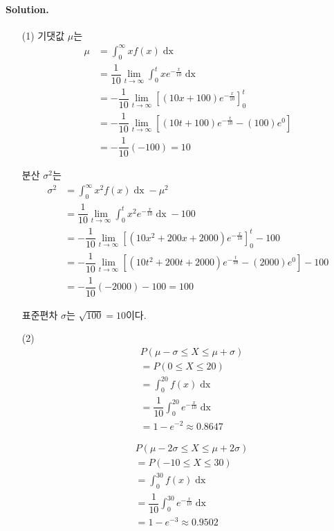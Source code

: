 \paragraph{Solution.}
\begin{itemize}
  \item [(1)] 기댓값 $\mu$는
\begin{align*}
  	\mu &= \int_0^\infty xf\left(x\right) \mathop{dx}\\
  	&= \dfrac{1}{10} \lim_{t \rightarrow \infty} \int_0^t xe^{-\frac{x}{10}} \mathop{dx}\\
  	&= -\dfrac{1}{10} \lim_{t \rightarrow \infty} \left[\left(10x + 100\right)e^{-\frac{x}{10}}\right]_0^t\\
  	&= -\dfrac{1}{10} \lim_{t \rightarrow \infty} \left[\left(10t + 100\right)e^{-\frac{t}{10}} - \left(100\right)e^0\right]\\
  	&= -\dfrac{1}{10}\left(-100\right) = 10
 \end{align*}
 
분산 $\sigma^2$는
\begin{align*}
  	\sigma^2 &= \int_0^\infty x^2f\left(x\right) \mathop{dx} - \mu^2\\
  	&= \dfrac{1}{10} \lim_{t \rightarrow \infty} \int_0^t x^2 e^{-\frac{x}{10}} \mathop{dx} - 100\\
  	&= -\dfrac{1}{10} \lim_{t \rightarrow \infty} \left[\left(10x^2 + 200x + 2000\right)e^{-\frac{x}{10}}\right]_0^t - 100\\
  	&= -\dfrac{1}{10} \lim_{t \rightarrow \infty} \left[\left(10t^2 + 200t + 2000\right)e^{-\frac{t}{10}} - \left(2000\right)e^0\right] - 100\\
  	&= -\dfrac{1}{10}\left(-2000\right) - 100 = 100
\end{align*}
 
표준편차 $\sigma$는 $\sqrt{100} = 10$이다.\\

  \item [(2)]
\begin{align*}
  	& P\left(\mu-\sigma\leq X\leq \mu+\sigma\right)\\
  	&= P\left(0 \leq X \leq 20\right)\\
  	&= \int_0^{20} f\left(x\right) \mathop{dx}\\
  	&= \dfrac{1}{10} \int_0^{20} e^{-\frac{x}{10}} \mathop{dx}\\
  	&= 1-e^{-2} \approx 0.8647
\end{align*}

\begin{align*}
  	& P\left(\mu-2\sigma\leq X\leq \mu+2\sigma\right)\\
  	&= P\left(-10 \leq X \leq 30\right)\\
  	&= \int_0^{30} f\left(x\right) \mathop{dx}\\
  	&= \dfrac{1}{10} \int_0^{30} e^{-\frac{x}{10}} \mathop{dx}\\
  	&= 1-e^{-3} \approx 0.9502
\end{align*}
\end{itemize}

